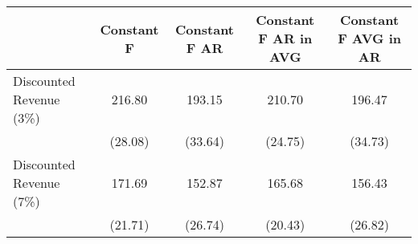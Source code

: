 \begin{tabular}{l*{4}{c}}
\hline\hline
                    &  Constant F&Constant F AR&Constant F AR in AVG&Constant F AVG in AR\\
\hline
Discounted Revenue (3\%)&      216.80&      193.15&      210.70&      196.47\\
                    &     (28.08)&     (33.64)&     (24.75)&     (34.73)\\
Discounted Revenue (7\%)&      171.69&      152.87&      165.68&      156.43\\
                    &     (21.71)&     (26.74)&     (20.43)&     (26.82)\\
\hline\hline
\end{tabular}
